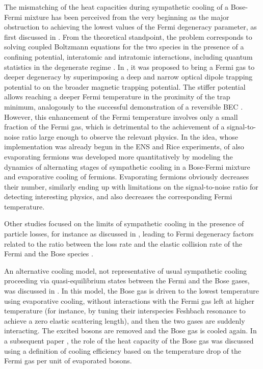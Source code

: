 \documentclass[pra,letterpaper,twocolumn,showpacs,superscriptaddress]{revtex4}
\begin{document}
The mismatching of the heat capacities during sympathetic cooling of a Bose-Fermi mixture has been perceived from the very 
beginning as the major obstruction to achieving the lowest values of the Fermi degeneracy parameter, as first discussed 
in \cite{Schreck2001a,Truscott2001}.  From the theoretical standpoint, the problem corresponds to solving coupled 
Boltzmann equations for the two species in the presence of a confining potential, interatomic and intratomic interactions, 
including quantum statistics in the degenerate regime \cite{Geist1999}. 
In \cite{Viverit2001}, it was proposed to bring a Fermi gas to deeper degeneracy by superimposing a deep and narrow 
optical dipole trapping potential to on the broader magnetic trapping potential. 
The stiffer potential allows reaching a deeper Fermi temperature in the proximity of the trap minimum, analogously 
to the successful demonstration of a reversible BEC  \cite{Stamper1998}. 
However, this enhancement of the Fermi temperature involves only a small fraction of the Fermi gas, which 
is detrimental to the achievement of a signal-to-noise ratio large enough to observe the relevant physics. 
In \cite{Wouters2002} the idea, whose implementation was already begun in the ENS and Rice experiments, of also evaporating  
fermions was developed more quantitatively by modeling the dynamics of alternating stages of 
sympathetic cooling in a Bose-Fermi mixture and evaporative cooling of fermions. 
Evaporating fermions obviously decreases their number, similarly ending up with limitations on the signal-to-noise 
ratio for detecting interesting physics, and also decreases the corresponding Fermi temperature. 

Other studies focused on the limits of sympathetic cooling in the presence of particle losses, for instance 
as discussed in \cite{Timmermans2001}, leading to Fermi degeneracy factors related to the ratio between the 
loss rate and the elastic collision rate of the Fermi and the Bose species \cite{Idziasek2005}. 

An alternative cooling model, not representative of usual sympathetic cooling proceeding via quasi-equilibrium states between the 
Fermi and the Bose gases, was discussed in \cite{Carr2004a}. In this model, the Bose gas is driven to 
the lowest temperature using evaporative cooling, without interactions with the Fermi gas left at higher temperature (for instance, by 
tuning their interspecies Feshbach resonance to achieve a zero elastic scattering length), and then the two gases are suddenly 
interacting. The excited bosons are removed and the Bose gas is cooled again. In a subsequent paper \cite{Carr2004b}, the role of the 
heat capacity of the Bose gas was discussed using a definition of cooling efficiency based on the temperature drop of the 
Fermi gas per unit of evaporated bosons.
\end{document}
